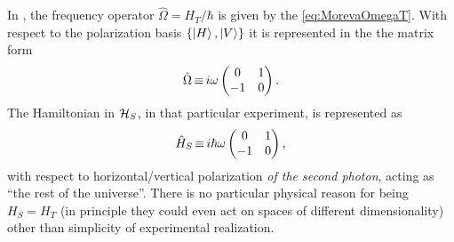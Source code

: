 In \cite{Moreva:illustration}, the frequency operator $\hat{\Omega} = H_T / \hbar$
is given by the \eqref{eq:MorevaOmegaT}. With respect to the polarization basis
$\qty{\ket{H}, \ket{V}}$ it is represented in the the matrix form
\begin{equation}
  \hat{\Omega} \operatorname*{\equiv} {
    i\omega
    \begin{pmatrix}
      0 & 1 \\
     -1 & 0
    \end{pmatrix}
  } \, \text{.}
\end{equation}
The Hamiltonian in $\mathcal{H}_S$, in that particular experiment, is represented as
\begin{equation}
  \hat{H}_S \operatorname*{\equiv} {
    i\hbar\omega
    \begin{pmatrix}
      0 & 1 \\
     -1 & 0
    \end{pmatrix}
  } \, \text{,}
\end{equation}
with respect to horizontal/vertical polarization \emph{of the second photon},
acting as ``the rest of the universe''.
There is no particular physical reason for being $H_S = H_T$
(in principle they could even act on spaces of different dimensionality)
other than simplicity of experimental realization.

